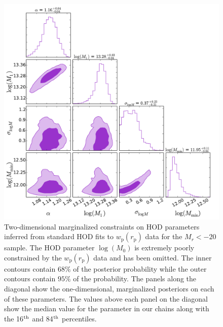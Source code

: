 \documentclass[usenatbib,usegraphicx,letterpaper]{mn2e}
\newcommand{\wprp}{w_{\mathrm{p}}}
\newcommand{\rp}{r_{\mathrm{p}}}
\begin{document}
\begin{figure}
\begin{center}
\includegraphics[width=15.0cm]{Mr20_covar_triangle_1.pdf}
\caption{
Two-dimensional marginalized constraints on HOD parameters inferred from
standard HOD fits to $\wprp(\rp)$ data for the $M_r<-20$ sample. The HOD parameter
$\log (M_0)$ is extremely poorly constrained by the $\wprp(\rp)$ data and has been
omitted. The inner contours contain $68\%$ of the posterior probability while the
outer contours contain $95\%$ of the probability. The panels along the diagonal
show the one-dimensional, marginalized posteriors on each of these parameters.
The values above each panel on the diagonal show the
median value for the parameter in our chains along with the
16$^{\rm th}$ and 84$^{\rm th}$ percentiles.
}
\label{fig:Mr20triangle}
\end{center}
\end{figure}
\end{document}
